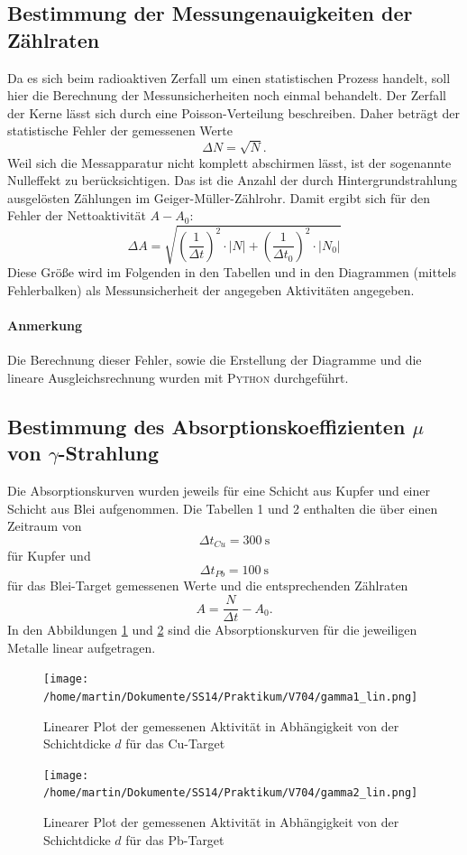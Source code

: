 \documentclass[11pt,ngerman,a4paper]{article}
\begin{document}
\subsection{Bestimmung der Messungenauigkeiten der Zählraten}
Da es sich beim radioaktiven Zerfall um einen statistischen Prozess handelt, soll hier die Berechnung der Messunsicherheiten noch einmal behandelt. Der Zerfall der Kerne lässt sich durch eine Poisson-Verteilung beschreiben. Daher beträgt der statistische Fehler der gemessenen Werte
\begin{equation}
\Delta N = \sqrt{N}.
\end{equation} 
Weil sich die Messapparatur nicht komplett abschirmen lässt, ist der sogenannte Nulleffekt zu berücksichtigen. Das ist die Anzahl der durch Hintergrundstrahlung ausgelösten Zählungen im Geiger-Müller-Zählrohr. Damit ergibt sich für den Fehler der Nettoaktivität $A-A_0$:
\begin{equation}
\Delta A = \sqrt{\left(\frac1{\Delta t}\right)^2 \cdot |N| +\left(\frac1{\Delta t_0}\right)^2 \cdot |N_0| }
\end{equation} 
Diese Größe wird im Folgenden in den Tabellen und in den Diagrammen (mittels Fehlerbalken) als Messunsicherheit der angegeben Aktivitäten angegeben. 
\paragraph{Anmerkung} Die Berechnung dieser Fehler, sowie die Erstellung der Diagramme und die lineare Ausgleichsrechnung wurden mit \textsc{Python} durchgeführt.  
\subsection{Bestimmung des Absorptionskoeffizienten $\mu$ von $\gamma$-Strahlung}
Die Absorptionskurven wurden jeweils für eine Schicht aus Kupfer und einer Schicht aus Blei aufgenommen. Die Tabellen 1 und 2 enthalten die über einen Zeitraum von 
\[
\Delta t_{Cu} = \SI{300}{\second}
\]
für Kupfer und
\[
\Delta t_{Pb} = \SI{100}{\second}
\]
für das Blei-Target gemessenen Werte und die entsprechenden Zählraten
\[
A = \frac{N}{\Delta t} - A_0.
\]
In den Abbildungen \ref{abb_gamma1_lin} und \ref{abb_gamma2_lin} sind die Absorptionskurven für die jeweiligen Metalle linear aufgetragen. 
\begin{figure}[H]
\centering
\texttt{[image: /home/martin/Dokumente/SS14/Praktikum/V704/gamma1\_lin.png]}
\caption{Linearer Plot der gemessenen Aktivität in Abhängigkeit von der Schichtdicke $d$ für das Cu-Target}
\label{abb_gamma1_lin}
\end{figure}
\begin{figure}[H]
\centering
\texttt{[image: /home/martin/Dokumente/SS14/Praktikum/V704/gamma2\_lin.png]}
\caption{Linearer Plot der gemessenen Aktivität in Abhängigkeit von der Schichtdicke $d$ für das Pb-Target}
\label{abb_gamma2_lin}
\end{figure}
\end{document}
